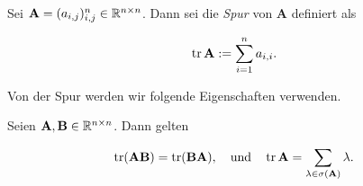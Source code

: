             \begin{definition} \label{def:trace}

                Sei $\mathbf A = (a_{i,j})_{i,j}^n \in \mathbb R^{n \times n}$.
                Dann sei die \textit{Spur} von $\mathbf A$ definiert als

                \begin{align*}
                    \operatorname{tr} \mathbf A := \sum_{i=1}^n a_{i, i}.
                \end{align*}

            \end{definition}

            Von der Spur werden wir folgende Eigenschaften verwenden.

            \begin{lemma} \label{lem:trace}

                Seien $\mathbf A, \mathbf B \in \mathbb R^{n \times n}$.
                Dann gelten

                \begin{align*}
                    \operatorname{tr}(\mathbf A \mathbf B) = \operatorname{tr}(\mathbf B \mathbf A),
                    \quad
                    \text{und}
                    \quad
                    \operatorname{tr} \mathbf A = \sum_{\lambda \in \sigma(\mathbf A)} \lambda.
                \end{align*}

            \end{lemma}

